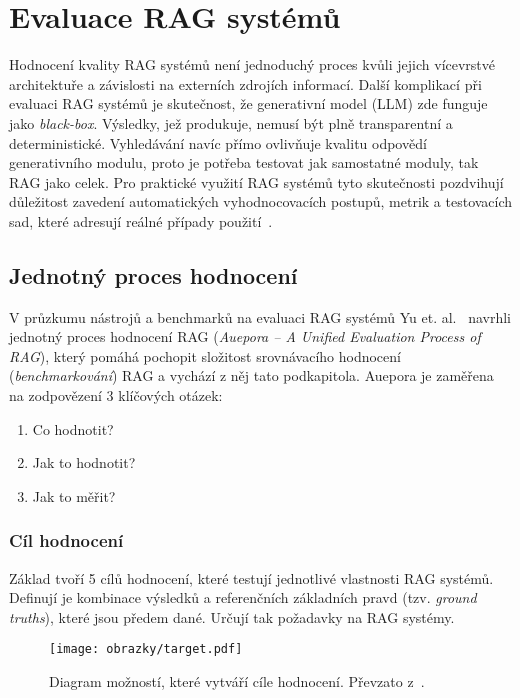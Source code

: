 \section{Evaluace RAG systémů}
\label{evaluaceteorie}

Hodnocení kvality RAG systémů není jednoduchý proces kvůli jejich vícevrstvé architektuře a závislosti na externích zdrojích informací. Další komplikací při evaluaci RAG systémů je skutečnost, že generativní model (LLM) zde funguje jako \textit{black-box}. Výsledky, jež produkuje, nemusí být plně transparentní a deterministické. Vyhledávání navíc přímo ovlivňuje kvalitu odpovědí generativního modulu, proto je potřeba testovat jak samostatné moduly, tak RAG jako celek. Pro praktické využití RAG systémů tyto skutečnosti pozdvihují důležitost zavedení automatických vyhodnocovacích postupů, metrik a testovacích sad, které adresují reálné případy použití~\cite{yu2025evaluationrag}.

\subsection{Jednotný proces hodnocení}
V průzkumu nástrojů a benchmarků na evaluaci RAG systémů Yu et. al.~\cite{yu2025evaluationrag} navrhli jednotný proces hodnocení RAG (\textit{Auepora – A Unified Evaluation Process of RAG}), který pomáhá pochopit složitost srovnávacího hodnocení (\textit{benchmarkování}) RAG a vychází z něj tato podkapitola. Auepora je zaměřena na zodpovězení 3 klíčových otázek:
\begin{enumerate}
    \item Co hodnotit?
    \item Jak to hodnotit?
    \item Jak to měřit?
\end{enumerate}

\subsubsection{Cíl hodnocení}
\label{targets}
Základ tvoří 5 cílů hodnocení, které testují jednotlivé vlastnosti RAG systémů. Definují je kombinace výsledků a referenčních základních pravd (tzv. \textit{ground truths}), které jsou předem dané. Určují tak požadavky na RAG systémy.

\begin{figure}[H]
    \centering
    \texttt{[image: obrazky/target.pdf]}
    \caption{Diagram možností, které vytváří cíle hodnocení. Převzato z~\cite{yu2025evaluationrag}.}
    \label{fig:targets}
\end{figure}

